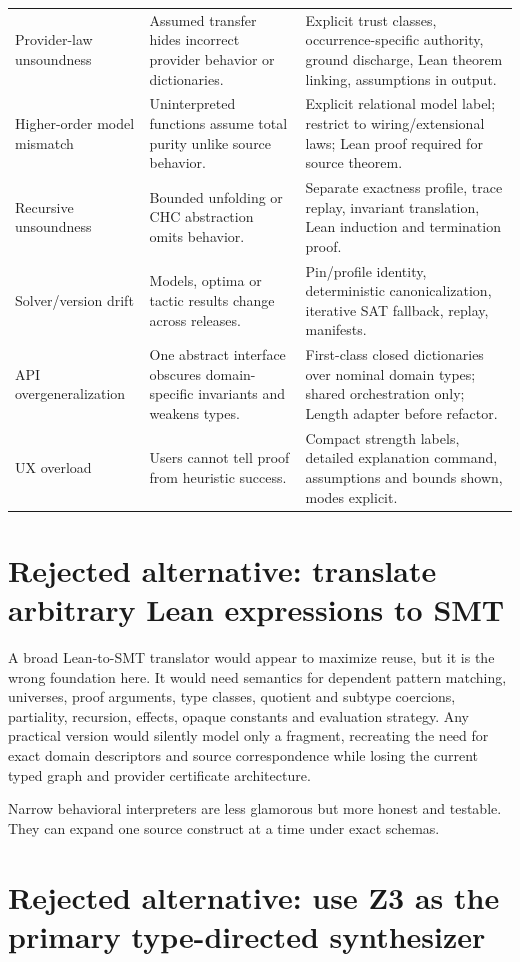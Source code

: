 \documentclass[11pt,oneside]{report}
\begin{document}
\begin{longtable}{@{}L{0.20\textwidth}L{0.36\textwidth}L{0.35\textwidth}@{}}
Provider-law unsoundness & Assumed transfer hides incorrect provider behavior or dictionaries. & Explicit trust classes, occurrence-specific authority, ground discharge, Lean theorem linking, assumptions in output. \\
Higher-order model mismatch & Uninterpreted functions assume total purity unlike source behavior. & Explicit relational model label; restrict to wiring/extensional laws; Lean proof required for source theorem. \\
Recursive unsoundness & Bounded unfolding or CHC abstraction omits behavior. & Separate exactness profile, trace replay, invariant translation, Lean induction and termination proof. \\
Solver/version drift & Models, optima or tactic results change across releases. & Pin/profile identity, deterministic canonicalization, iterative SAT fallback, replay, manifests. \\
API overgeneralization & One abstract interface obscures domain-specific invariants and weakens types. & First-class closed dictionaries over nominal domain types; shared orchestration only; Length adapter before refactor. \\
UX overload & Users cannot tell proof from heuristic success. & Compact strength labels, detailed explanation command, assumptions and bounds shown, modes explicit. \\
\end{longtable}

\section{Rejected alternative: translate arbitrary Lean expressions to SMT}

A broad Lean-to-SMT translator would appear to maximize reuse, but it is the wrong foundation here. It would need semantics for dependent pattern matching, universes, proof arguments, type classes, quotient and subtype coercions, partiality, recursion, effects, opaque constants and evaluation strategy. Any practical version would silently model only a fragment, recreating the need for exact domain descriptors and source correspondence while losing the current typed graph and provider certificate architecture.

Narrow behavioral interpreters are less glamorous but more honest and testable. They can expand one source construct at a time under exact schemas.

\section{Rejected alternative: use Z3 as the primary type-directed synthesizer}
\end{document}
